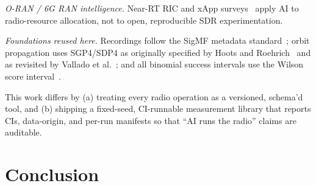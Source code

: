 \documentclass[journal]{IEEEtran}
\begin{document}
\emph{O-RAN / 6G RAN intelligence.}  Near-RT RIC and xApp
surveys~\cite{polese2023understanding} apply AI to radio-resource allocation,
not to open, reproducible SDR experimentation.

\emph{Foundations reused here.}  Recordings follow the SigMF metadata
standard~\cite{sigmf_spec}; orbit propagation uses SGP4/SDP4 as originally
specified by Hoots and Roehrich~\cite{hoots1980spacetrack} and as revisited by
Vallado et al.~\cite{vallado2006revisiting}; and all binomial success intervals
use the Wilson score interval~\cite{wilson1927}.

This work differs by (a) treating every radio operation as a versioned,
schema'd tool, and (b) shipping a fixed-seed, CI-runnable measurement library
that reports CIs, data-origin, and per-run manifests so that ``AI runs the
radio'' claims are auditable.

\section{Conclusion}

\end{document}
